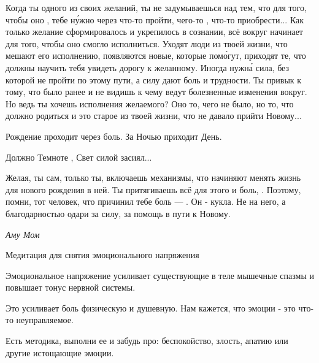 Когда ты   одного из своих желаний, ты не задумываешься над тем, что для того, чтобы оно , тебе н\'{у}жно через что-то пройти, чего-то , что-то приобрести... Как только желание сформировалось и укрепилось в сознании, всё вокруг начинает  для того, чтобы оно смогло исполниться. Уходят люди из твоей жизни, что мешают его исполнению, появляются новые, которые пом\'{о}гут, приходят те, что должны научить тебя увидеть дорогу к желанному. Иногда нужн\'{а} сила, без которой не пройти по этому пути, а силу дают боль и трудности. Ты привык к тому, что было ранее и не видишь к чему ведут болезненные изменения вокруг. Но ведь ты хочешь исполнения желаемого? Оно то, чего не было, но то, что должно родиться и это  старое из твоей жизни, что не давало прийти Новому...

Рождение проходит через боль. За Ночью приходит День.

Должно Темноте ,  Свет силой засиял...

Желая, ты сам, только ты, включаешь механизмы, что начиняют менять жизнь для нового рождения в ней. Ты притягиваешь всё для этого и боль, . Поэтому, помни, тот человек, что причинил тебе боль --- . Он - кукла. Не  на него, а благодарностью одари за силу, за помощь в пути к Новому.

\begin{flushright}
    \it Аму Мом
\end{flushright}

Медитация для снятия эмоционального напряжения

Эмоциональное напряжение усиливает существующие в теле мышечные спазмы и повышает тонус нервной системы.

Это усиливает боль физическую и душевную. Нам кажется, что эмоции - это что-то неуправляемое.

Есть методика, выполни ее и забудь про: беспокойство, злость, апатию или другие истощающие эмоции.

